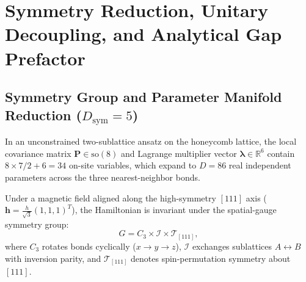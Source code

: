 \chapter{Symmetry Reduction, Unitary Decoupling, and Analytical Gap Prefactor}
\label{ch:phase4_analytical_mf}

\section{Symmetry Group and Parameter Manifold Reduction ($D_{\mathrm{sym}} = 5$)}
\label{sec:phase4_symmetry_reduction}

In an unconstrained two-sublattice ansatz on the honeycomb lattice, the local covariance matrix $\mathbf{P} \in \mathrm{so}(8)$ and Lagrange multiplier vector $\bm{\lambda} \in \mathbb{R}^6$ contain $8 \times 7 / 2 + 6 = 34$ on-site variables, which expand to $D = 86$ real independent parameters across the three nearest-neighbor bonds.

Under a magnetic field aligned along the high-symmetry $[111]$ axis ($\bm{h} = \frac{h}{\sqrt{3}}(1, 1, 1)^T$), the Hamiltonian is invariant under the spatial-gauge symmetry group:
\begin{equation}
G = C_3 \times \mathcal{I} \times \mathcal{T}_{[111]},
\end{equation}
where $C_3$ rotates bonds cyclically ($x \to y \to z$), $\mathcal{I}$ exchanges sublattices $A \leftrightarrow B$ with inversion parity, and $\mathcal{T}_{[111]}$ denotes spin-permutation symmetry about $[111]$.

